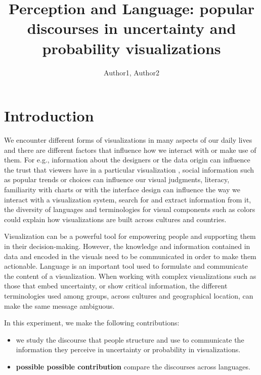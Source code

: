 \documentclass{proc}
\begin{document}
\title{Perception and Language:  popular discourses in uncertainty and probability visualizations}


\author{Author1, Author2}

\maketitle

\section{Introduction}
We encounter different forms of visualizations in many aspects of our daily lives and there are different factors that influence how we interact with or make use of them. For e.g., information about the designers or the data origin can influence the trust that viewers have in a particular visualization \cite{peck2019data}, social information such as popular trends or choices can influence our visual judgments\cite{hullman2011impact}, literacy, familiarity with charts or with the interface design \cite{blascheck2018exploration} can influence the way we interact with a visualization system, search for and extract information from it, the diversity of languages and terminologies for visual components such as colors \cite{lindsey2009world} could explain how visualizations are built across cultures and countries. 

Visualization can be a powerful tool for empowering people and supporting them in their decision-making. However, the knowledge and information contained in data and encoded in the visuals need to be communicated in order to make them actionable. Language is an important tool used to formulate and communicate the content of a visualization. When working with complex visualizations such as those that embed uncertainty, or show critical information, the different terminologies used among groups, across cultures and geographical location, can make the same message ambiguous. 

In this experiment, we make the following contributions: 
\begin{itemize}
    \item we study the discourse that people structure and use to communicate the information they perceive in uncertainty or probability in visualizations. 
    \item \textbf{possible possible contribution} compare the discourses across languages. 
\end{itemize}
 
\end{document}
